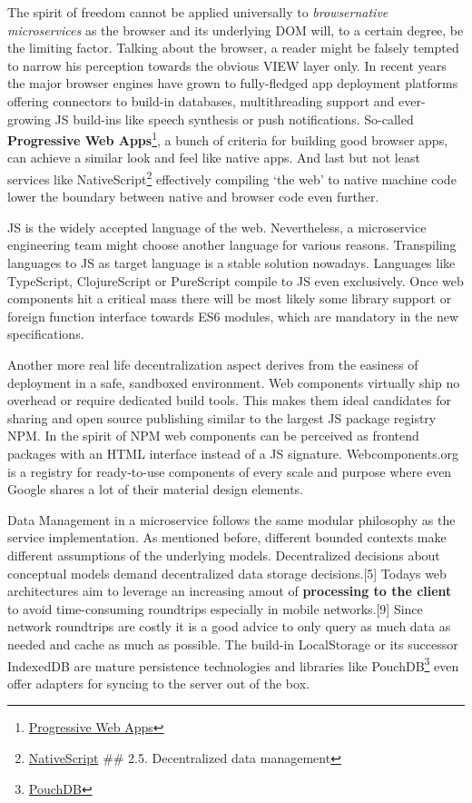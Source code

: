 \documentclass[]{article}
\begin{document}
The spirit of freedom cannot be applied universally to
\emph{browsernative microservices} as the browser and its underlying DOM
will, to a certain degree, be the limiting factor. Talking about the
browser, a reader might be falsely tempted to narrow his perception
towards the obvious VIEW layer only. In recent years the major browser
engines have grown to fully-fledged app deployment platforms offering
connectors to build-in databases, multithreading support and
ever-growing JS build-ins like speech synthesis or push notifications.
So-called \textbf{Progressive Web Apps}\footnote{\href{https://developers.google.com/web/progressive-web-apps}{Progressive
  Web Apps}}, a bunch of criteria for building good browser apps, can
achieve a similar look and feel like native apps. And last but not least
services like NativeScript\footnote{\href{https://www.nativescript.org}{NativeScript}
  \#\# 2.5. Decentralized data management} effectively compiling `the
web' to native machine code lower the boundary between native and
browser code even further.

JS is the widely accepted language of the web. Nevertheless, a
microservice engineering team might choose another language for various
reasons. Transpiling languages to JS as target language is a stable
solution nowadays. Languages like TypeScript, ClojureScript or
PureScript compile to JS even exclusively. Once web components hit a
critical mass there will be most likely some library support or foreign
function interface towards ES6 modules, which are mandatory in the new
specifications.

Another more real life decentralization aspect derives from the easiness
of deployment in a safe, sandboxed environment. Web components virtually
ship no overhead or require dedicated build tools. This makes them ideal
candidates for sharing and open source publishing similar to the largest
JS package registry NPM. In the spirit of NPM web components can be
perceived as frontend packages with an HTML interface instead of a JS
signature. Webcomponents.org is a registry for ready-to-use components
of every scale and purpose where even Google shares a lot of their
material design elements.

Data Management in a microservice follows the same modular philosophy as
the service implementation. As mentioned before, different bounded
contexts make different assumptions of the underlying models.
Decentralized decisions about conceptual models demand decentralized
data storage decisions.{[}5{]} Todays web architectures aim to leverage
an increasing amout of \textbf{processing to the client} to avoid
time-consuming roundtrips especially in mobile networks.{[}9{]} Since
network roundtrips are costly it is a good advice to only query as much
data as needed and cache as much as possible. The build-in LocalStorage
or its successor IndexedDB are mature persistence technologies and
libraries like PouchDB\footnote{\href{https://pouchdb.com/}{PouchDB}}
even offer adapters for syncing to the server out of the box.
\end{document}
